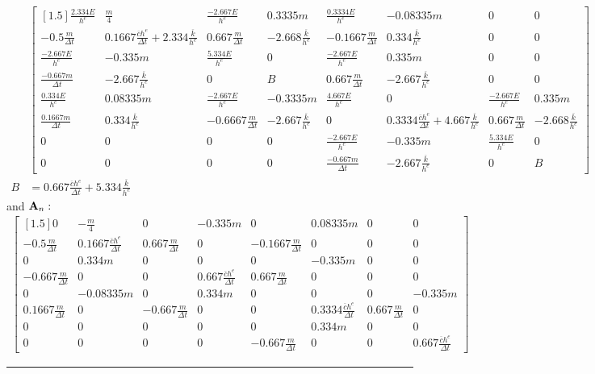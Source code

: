\begin{align*}
& \begin{bmatrix}[1.5]
\frac{2.334E}{h^e} & \frac{m}{4} & \frac{-2.667E}{h^e} & 0.3335m & \frac{0.3334E}{h^e} & -0.08335m & 0 & 0\\
-0.5\frac{m}{\Delta t} & 0.1667\frac{\overline{c}h^e}{\Delta t}+2.334\frac{\overline{k}}{h^e} & 0.667\frac{m}{\Delta t} & -2.668\frac{\overline{k}}{h^e} & -0.1667\frac{m}{\Delta t} & 0.334\frac{\overline{k}}{h^e}  & 0 & 0  \\
\frac{-2.667E}{h^e} & -0.335m & \frac{5.334E}{h^e} & 0 & \frac{-2.667E}{h^e} & 0.335m & 0 & 0 \\
\frac{-0.667m}{\Delta t} & -2.667\frac{\overline{k}}{h^e} & 0 & B & 0.667\frac{m}{\Delta t} & -2.667\frac{\overline{k}}{h^e}  & 0 & 0\\
\frac{0.334E}{h^e} & 0.08335m & \frac{-2.667E}{h^e} & -0.3335m & \frac{4.667E}{h^e} & 0  & \frac{-2.667E}{h^e} & 0.335m \\ 
\frac{0.1667m}{\Delta t} & 0.334\frac{\overline{k}}{h^e} & -0.6667\frac{m}{\Delta t} & -2.667\frac{\overline{k}}{h^e} & 0 & 0.3334\frac{\overline{c}h^e}{\Delta t}+ 4.667\frac{\overline{k}}{h^e} & 0.667\frac{m}{\Delta t} & -2.668\frac{\overline{k}}{h^e} \\
 0 & 0 & 0 & 0 & \frac{-2.667E}{h^e} & -0.335m & \frac{5.334E}{h^e} & 0  \\
0 & 0 & 0 & 0 & \frac{-0.667m}{\Delta t} & -2.667\frac{\overline{k}}{h^e} & 0 & B
\end{bmatrix}\\
B & =
0.667\frac{\overline{c}h^e}{\Delta t}+5.334\frac{\overline{k}}{h^e}
\end{align*}
and ${\bf A}_n:$
\begin{align*}
\begin{bmatrix}[1.5]
 0 & -\frac{m}{4} & 0 & -0.335m & 0 & 0.08335m & 0 & 0\\
 -0.5\frac{m}{\Delta t} & 0.1667\frac{\overline{c}h^e}{\Delta t} & 0.667\frac{m}{\Delta t} & 0 & -0.1667\frac{m}{\Delta t} & 0  & 0 & 0\\
 0 & 0.334m & 0 & 0 & 0 & -0.335m  & 0 & 0\\
 -0.667\frac{m}{\Delta t} & 0 & 0 & 0.667\frac{\overline{c}h^e}{\Delta t} & 0.667\frac{m}{\Delta t} & 0  & 0 & 0\\
 0 & -0.08335m & 0 & 0.334m & 0 & 0  & 0 & -0.335m \\
 0.1667\frac{m}{\Delta t} & 0 & -0.667\frac{m}{\Delta t} & 0 & 0 & 0.3334\frac{\overline{c}h^e}{\Delta t}  & 0.667\frac{m}{\Delta t} & 0\\
0 & 0 & 0 & 0 &  0 & 0.334m & 0 & 0  \\
0 & 0 & 0 & 0 & -0.667\frac{m}{\Delta t} & 0 & 0 & 0.667\frac{\overline{c}h^e}{\Delta t} 
\end{bmatrix}
\end{align*}\hrule
